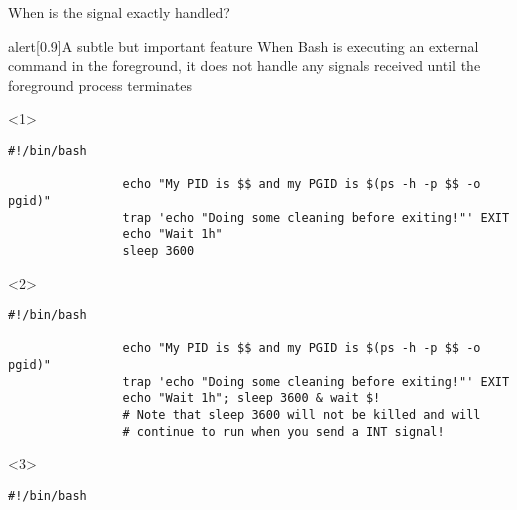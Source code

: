 \begin{frame}[fragile]{When is the signal exactly handled?}
    \vspace{-5mm}
    \begin{varblock}{alert}[0.9\textwidth]{A subtle but important feature}
        When Bash is executing an external command in the foreground, it does not handle any signals received until the foreground process terminates
    \end{varblock}
    \begin{overlayarea}{\textwidth}{0.33\textheight}
        \begin{onlyenv}<1>
            \begin{lstlisting}[style=MyBash]
                #!/bin/bash
                
                echo "My PID is $$ and my PGID is $(ps -h -p $$ -o pgid)"
                trap 'echo "Doing some cleaning before exiting!"' EXIT
                echo "Wait 1h"
                sleep 3600
            \end{lstlisting}
        \end{onlyenv}
        \begin{onlyenv}<2>
            \begin{lstlisting}[style=MyBash]
                #!/bin/bash
                
                echo "My PID is $$ and my PGID is $(ps -h -p $$ -o pgid)"
                trap 'echo "Doing some cleaning before exiting!"' EXIT
                echo "Wait 1h"; sleep 3600 & wait $!
                # Note that sleep 3600 will not be killed and will
                # continue to run when you send a INT signal!
            \end{lstlisting}
        \end{onlyenv}
        \begin{onlyenv}<3>
            \begin{lstlisting}[style=MyBash]
                #!/bin/bash
                

\end{lstlisting}
\end{onlyenv}
\end{overlayarea}
\end{frame}
